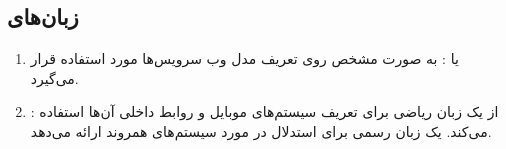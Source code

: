 \documentclass[a4paper]{article}
\begin{document}
\subsection{زبان‌های }

\begin{enumerate}
    \item {} یا : به
    صورت مشخص روی تعریف مدل  وب سرویس‌ها مورد استفاده قرار
    می‌گیرد.
    \item {}: از یک زبان ریاضی برای تعریف سیستم‌های موبایل و روابط
    داخلی آن‌ها استفاده می‌کند. یک زبان رسمی برای استدلال در مورد سیستم‌های
    همروند ارائه می‌دهد.
\end{enumerate}



\end{document}
